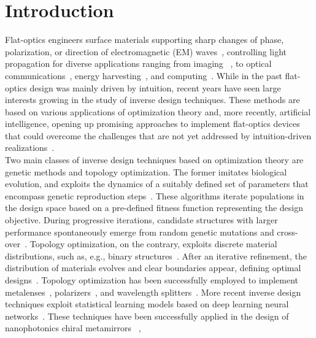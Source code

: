 \documentclass[two-columns]{nature}
\begin{document}
\section*{Introduction}
Flat-optics engineers surface materials supporting
sharp changes of phase, polarization, or direction of electromagnetic (EM)
waves~\cite{yu2014flat}, controlling light propagation for diverse
applications ranging from imaging ~\cite{banerji2019imaging, aflatouni2015nanophotonic}, to
optical communications~\cite{sun2016optical, wang2018nanophotonic}, energy
harvesting~\cite{guo2014metallic, baranov2019nanophotonic}, and
computing~\cite{zhu2017plasmonic, zhou2020flat}. While in the past flat-optics design was mainly driven by intuition, recent years have seen
large interests growing in the study of inverse design techniques. These
methods are based on various applications of optimization theory and, more
recently, artificial intelligence, opening up promising approaches to implement
flat-optics devices that could overcome the challenges that are not yet addressed by intuition-driven
realizations~\cite{molesky2018inverse}.\\
Two main classes of inverse design
techniques based on optimization theory are genetic methods and topology optimization. The former imitates
biological evolution, and exploits the dynamics of a suitably defined set of
parameters that encompass genetic reproduction steps~\cite{goldberg1988genetic}.
These algorithms iterate populations in the design space based on a pre-defined
fitness function representing the design
objective.
During progressive iterations, candidate structures with larger performance spontaneously emerge from random genetic
mutations and cross-over~\cite{wiecha2017evolutionary,huntington2014subwavelength,feichtner2012evolutionary}.
Topology optimization, on the contrary, exploits discrete material
distributions, such as, e.g., binary structures~\cite{jensen2005topology}. After an iterative refinement, the distribution of materials evolves and clear boundaries appear, defining optimal
designs~\cite{sigmund2013topology}. Topology optimization has been successfully employed to
implement metalenses~\cite{otomori2017topology, phan2019high,bruner2021},
polarizers~\cite{frandsen2016inverse, shen2014ultra, shen2015integrated}, and wavelength
splitters~\cite{piggott2015inverse}.
More recent inverse design techniques exploit statistical learning models based on deep learning neural
networks~\cite{lecun2015deep,leung1991complex, leonard1990improvement}. These techniques have
been successfully applied in the design of nanophotonics chiral metamirrors ~\cite{ma2018deep},
\end{document}
